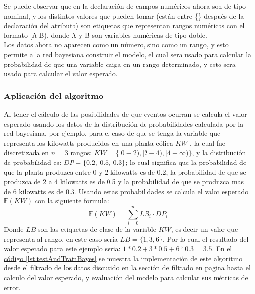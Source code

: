 Se puede observar que en la declaración de campos numéricos ahora son de tipo nominal, y los distintos valores que pueden tomar (están entre \{\} después de la declaración del atributo) son etiquetas que representan rangos numéricos con el formato [A-B), donde A y B son variables numéricas de tipo doble.\\
Los datos ahora no aparecen como un número, sino como un rango, y esto permite a la red bayesiana construir el modelo, el cual sera usado para calcular la probabilidad de que una variable caiga en un rango determinado, y esto sera usado para calcular el valor esperado.

\subsubsection{Aplicación del algoritmo}
Al tener el cálculo de las posibilidades de que eventos ocurran se calcula el valor esperado
usando los datos de la distribución de probabilidades calculada por la red bayesiana, por ejemplo, para el caso de que se tenga la  variable que representa los kilowatts producidos en una planta eólica $KW$ , la cual fue discretizada en $n=3$ rangos: 
$KW= \{[0-2), [2-4), [4-\infty)\}$, y la distribución de probabilidad es: 
$DP= \{0.2,~0.5,~0.3\} $; lo cual significa que la probabilidad de que la planta produzca entre 0 y 2 kilowatts es de 0.2, la probabilidad de que se produzca de 2 a 4 kilowatts es de 0.5 y la probabilidad de que se produzca mas de 6 kilowatts es de 0.3. 
Usando estas probabilidades se calcula el valor esperado $\mathbb{E}(KW)$ con la siguiente formula: 
\begin{equation}  \label{eq:valorEsperado}
	\mathbb{E}(KW) = \sum_{i=0}^{n}{LB}_i \cdot {DP}_i 
\end{equation}
Donde $LB$ son las etiquetas de clase de la variable $KW$, es decir un valor que representa al rango, en este caso seria 
$LB=\{1, 3, 6\}$. 
Por lo cual el resultado del valor esperado para este ejemplo seria: $1*0.2 + 3*0.5 + 6*0.3= 3.5$.
En el \hyperref[lst:testAndTrainBayes]{ código \ref{lst:testAndTrainBayes}} se muestra la implementación de este algoritmo desde el filtrado de los datos discutido en la sección de filtrado en pagina \pageref{sec:filtrado} hasta el calculo del valor esperado, y evaluación del modelo para calcular sus métricas de error.

